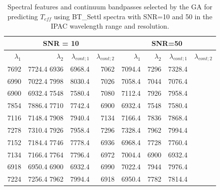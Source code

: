 \begin{table}
\begin{center}
\begin{tabular}{rrrr | rrrr}
  \hline
 \multicolumn{4}{c}{SNR = 10} &  \multicolumn{4}{c}{SNR=50} \\
  \hline
$\lambda_1$ & $\lambda_2$ & $\lambda_{cont;1}$ & $\lambda_{cont;2} $ & $\lambda_1$ & $\lambda_2$ & $\lambda_{cont;1}$ & $\lambda_{cont;2} $ \\ 
  \hline
7692 & 7724.4 	6936 & 6968.4  & 7062 & 7094.4 &  7296 & 7328.4 \\
6990 & 7022.4 	7998 & 8030.4  & 7026 & 7058.4 &  7044 & 7076.4 \\
6900 & 6932.4 	7548 & 7580.4  & 7080 & 7112.4 &  7926 & 7958.4 \\
7854 & 7886.4 	7710 & 7742.4  & 6900 & 6932.4 &  7548 & 7580.4 \\
7116 & 7148.4 	7908 & 7940.4  & 7134 & 7166.4 &  7836 & 7868.4 \\
7278 & 7310.4 	7926 & 7958.4  & 7296 & 7328.4 &  7962 & 7994.4 \\
7152 & 7184.4 	7746 & 7778.4  & 6936 & 6968.4 &  7728 & 7760.4 \\
7134 & 7166.4 	7764 & 7796.4  & 6972 & 7004.4 &  6900 & 6932.4 \\
6918 & 6950.4 	6900 & 6932.4  & 6990 & 7022.4 &  7944 & 7976.4 \\
7224 & 7256.4 	7962 & 7994.4  & 6918 & 6950.4 &  7782 & 7814.4 \\

\hline
\end{tabular}
\caption {Spectral features and continuum bandpasses selected by the
  GA for predicting $ T_{eff}$ using BT\_Settl spectra with SNR=10 and
  50 in the IPAC wavelength range and
  resolution.} \label{tab:ipac-teff-noisy}
\end{center}
\end{table}


